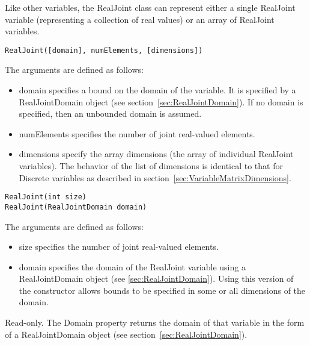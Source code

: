Like other variables, the RealJoint class can represent either a single RealJoint variable (representing a collection of real values) or an array of RealJoint variables.


\ifmatlab
\begin{lstlisting}
RealJoint([domain], numElements, [dimensions])
\end{lstlisting}

The arguments are defined as follows:

\begin{itemize}
\item domain specifies a bound on the domain of the variable.  It is specified by a RealJointDomain object (see section~\ref{sec:RealJointDomain}).  If no domain is specified, then an unbounded domain is assumed.
\item numElements specifies the number of joint real-valued elements.
\item dimensions specify the array dimensions (the array of individual RealJoint variables).  The behavior of the list of dimensions is identical to that for Discrete variables as described in section~\ref{sec:VariableMatrixDimensions}.
\end{itemize}
\fi

\ifjava
\begin{lstlisting}
RealJoint(int size)
RealJoint(RealJointDomain domain)
\end{lstlisting}

The arguments are defined as follows:

\begin{itemize}
\item size specifies the number of joint real-valued elements.
\item domain specifies the domain of the RealJoint variable using a RealJointDomain object (see \ref{sec:RealJointDomain}).  Using this version of the constructor allows bounds to be specified in some or all dimensions of the domain.
\end{itemize}
\fi


\label{sec:RealJoint.Domain}

Read-only.  The Domain property returns the domain of that variable in the form of a RealJointDomain object (see section~\ref{sec:RealJointDomain}).

\label{sec:RealJoint.Belief}


